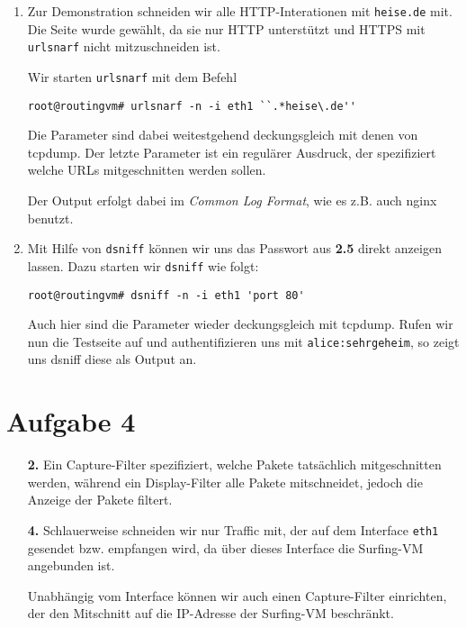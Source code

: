 \documentclass{scrartcl}
\begin{document}
    \begin{enumerate}[\bf 1.]
        \item Zur Demonstration schneiden wir alle HTTP-Interationen mit \texttt{heise.de}
              mit. Die Seite wurde gewählt, da sie nur HTTP unterstützt und HTTPS
              mit \texttt{urlsnarf} nicht mitzuschneiden ist.

              Wir starten \texttt{urlsnarf} mit dem Befehl
              \begin{lstlisting}[style=BashInputStyle]
root@routingvm# urlsnarf -n -i eth1 ``.*heise\.de''
              \end{lstlisting}

              Die Parameter sind dabei weitestgehend deckungsgleich mit denen
              von tcpdump. Der letzte Parameter ist ein regulärer Ausdruck, der
              spezifiziert welche URLs mitgeschnitten werden sollen.

              Der Output erfolgt dabei im \textit{Common Log Format}, wie es z.B.
              auch nginx benutzt.

        \item Mit Hilfe von \texttt{dsniff} können wir uns das Passwort aus \textbf{2.5}
              direkt anzeigen lassen. Dazu starten wir \texttt{dsniff} wie folgt:

              \begin{lstlisting}[style=BashInputStyle]
root@routingvm# dsniff -n -i eth1 'port 80'
              \end{lstlisting}

              Auch hier sind die Parameter wieder deckungsgleich mit tcpdump.
              Rufen wir nun die Testseite auf und authentifizieren uns mit
              \texttt{alice:sehrgeheim}, so zeigt uns dsniff diese als Output an.
    \end{enumerate}

    \section{Aufgabe 4}
    \label{sec:Aufgabe 4}

    \begin{enumerate}[\bf 1.]
        \item[\bf 2.] Ein Capture-Filter spezifiziert, welche Pakete tatsächlich
                      mitgeschnitten werden, während ein Display-Filter alle
                      Pakete mitschneidet, jedoch die Anzeige der Pakete filtert.

        \item[\bf 4.] Schlauerweise schneiden wir nur Traffic mit, der auf dem
                      Interface \texttt{eth1} gesendet bzw. empfangen wird,
                      da über dieses Interface die Surfing-VM angebunden ist.

                      Unabhängig vom Interface können wir auch einen Capture-Filter
                      einrichten, der den Mitschnitt auf die IP-Adresse der
                      Surfing-VM beschränkt.
    \end{enumerate}
\end{document}
